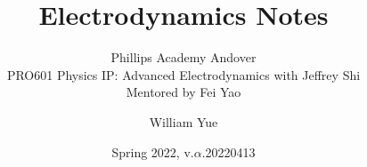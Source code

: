 \documentclass[11pt, oneside]{scrbook}
\begin{document}
\title{Electrodynamics Notes}
\subtitle{Phillips Academy Andover\\
PRO601 Physics IP: Advanced Electrodynamics with Jeffrey Shi\\
Mentored by Fei Yao}
\author{William Yue}
\date{Spring 2022, v.$\alpha$.20220413}
\maketitle



\tableofcontents




\end{document}
